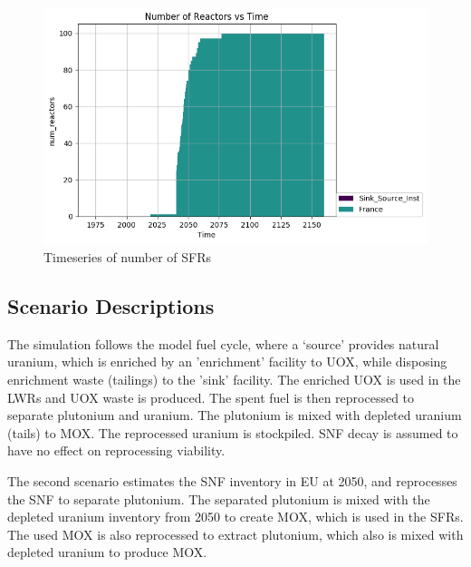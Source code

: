 \begin{figure}[htbp!]
	\begin{center}
		\includegraphics{./images/number_plot.png}
	\end{center}
	\caption{Timeseries of number of \gls{SFR}s}
	\label{fig:sfr_num}
\end{figure}



\subsection{Scenario Descriptions}
The simulation follows the model fuel cycle, where a `source'
provides natural uranium, which is enriched by an 'enrichment'
facility to \gls{UOX}, while disposing enrichment waste (tailings)
to the 'sink' facility. The enriched \gls{UOX} is used
in the \gls{LWR}s and \gls{UOX} waste is produced. The spent fuel
is then reprocessed to separate plutonium and uranium.
The plutonium is mixed with depleted uranium (tails) to \gls{MOX}.
The reprocessed uranium is stockpiled. \gls{SNF} decay is assumed
to have no effect on reprocessing viability.

The second scenario estimates the \gls{SNF} inventory in EU at 2050,
and reprocesses the \gls{SNF} to separate plutonium. The separated
plutonium is mixed with the depleted uranium inventory from 2050
to create \gls{MOX}, which is used in the \gls{SFR}s. The used
\gls{MOX} is also reprocessed to extract plutonium, which also
is mixed with depleted uranium to produce \gls{MOX}.



